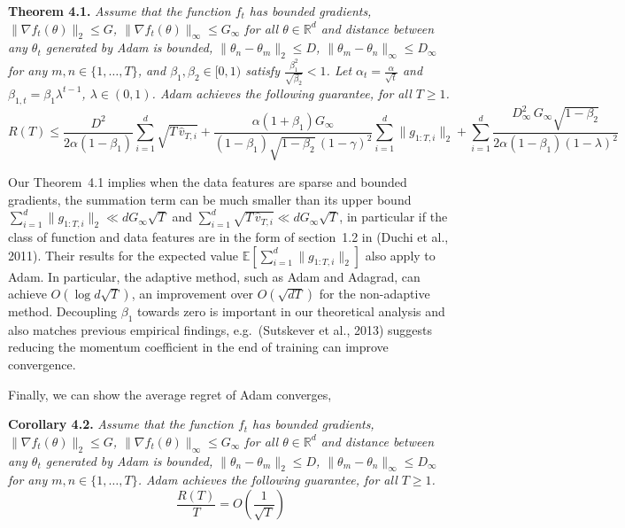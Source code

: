 \documentclass[11pt]{article}
\begin{document}
\noindent\textbf{Theorem 4.1.} \emph{Assume that the function
$f_t$ has bounded gradients,
$\|\nabla f_t(\theta)\|_2 \leq G$,
$\|\nabla f_t(\theta)\|_\infty \leq G_\infty$ for all
$\theta \in \mathbb{R}^d$ and distance between any $\theta_t$
generated by Adam is bounded,
$\|\theta_n - \theta_m\|_2 \leq D$,
$\|\theta_m - \theta_n\|_\infty \leq D_\infty$ for any
$m, n \in \{1, \ldots, T\}$, and $\beta_1, \beta_2 \in [0, 1)$
satisfy $\frac{\beta_1^2}{\sqrt{\beta_2}} < 1$. Let
$\alpha_t = \frac{\alpha}{\sqrt{t}}$ and
$\beta_{1,t} = \beta_1 \lambda^{t-1}$, $\lambda \in (0, 1)$.
Adam achieves the following guarantee, for all $T \geq 1$.}
%
\[
R(T) \leq \frac{D^2}{2\alpha(1 - \beta_1)}
          \sum_{i=1}^{d} \sqrt{T \, \widehat{v}_{T,i}}
        + \frac{\alpha(1 + \beta_1) G_\infty}
               {(1 - \beta_1)\sqrt{1 - \beta_2}\,(1 - \gamma)^2}
          \sum_{i=1}^{d} \|g_{1:T,i}\|_2
        + \sum_{i=1}^{d}
          \frac{D_\infty^2 \, G_\infty \sqrt{1 - \beta_2}}
               {2\alpha(1 - \beta_1)(1 - \lambda)^2}
\]

\noindent
Our Theorem~4.1 implies when the data features are sparse and
bounded gradients, the summation term can be much smaller than
its upper bound
$\sum_{i=1}^{d} \|g_{1:T,i}\|_2 \ll dG_\infty\sqrt{T}$ and
$\sum_{i=1}^{d} \sqrt{T\,\widehat{v}_{T,i}} \ll dG_\infty\sqrt{T}$,
in particular if the class of function and data features are in
the form of section~1.2 in (Duchi et al., 2011). Their results
for the expected value
$\mathbb{E}[\sum_{i=1}^{d} \|g_{1:T,i}\|_2]$ also apply to Adam.
In particular, the adaptive method, such as Adam and Adagrad, can
achieve $O(\log d\sqrt{T})$, an improvement over $O(\sqrt{dT})$
for the non-adaptive method. Decoupling $\beta_1$ towards zero is
important in our theoretical analysis and also matches previous
empirical findings, e.g.\ (Sutskever et al., 2013) suggests
reducing the momentum coefficient in the end of training can
improve convergence.

Finally, we can show the average regret of Adam converges,

\vspace{0.5em}

\noindent\textbf{Corollary 4.2.} \emph{Assume that the function
$f_t$ has bounded gradients,
$\|\nabla f_t(\theta)\|_2 \leq G$,
$\|\nabla f_t(\theta)\|_\infty \leq G_\infty$ for all
$\theta \in \mathbb{R}^d$ and distance between any $\theta_t$
generated by Adam is bounded,
$\|\theta_n - \theta_m\|_2 \leq D$,
$\|\theta_m - \theta_n\|_\infty \leq D_\infty$ for any
$m, n \in \{1, \ldots, T\}$. Adam achieves the following
guarantee, for all $T \geq 1$.}
%
\[
\frac{R(T)}{T} = O\!\left(\frac{1}{\sqrt{T}}\right)
\]
\end{document}
